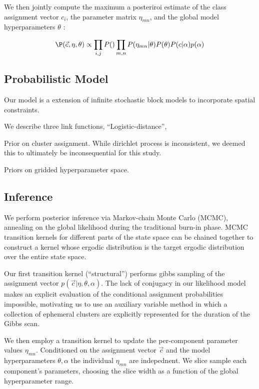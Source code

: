 \documentclass{nature}
\begin{document}
We then jointly compute the maximum a posteriroi estimate of the class
assignment vector ${c_i}$, the parameter matrix $\eta_{mn}$, and the
global model hyperparameters $\theta$ :

\begin{equation}
  \P(\vec{c}, \eta, \theta) \propto \prod_{i, j} P() \prod_{m, n} P(\eta_{mn} | \theta)  P(\theta) P(c | \alpha) p(\alpha) 
\end{equation}



\subsection{Probabilistic Model}

Our model is a extension of infinite stochastic block models
\cite{Kemp, other guys} to incorporate spatial constraints.

We describe three link functions, ``Logistic-distance'', 

Prior on cluster assignment. While dirichlet process is inconsistent,
we deemed this to ultimately be inconsequential for this study.

Priors on gridded hyperparameter space. 



\subsection{Inference} 
We perform posterior inference via Markov-chain Monte Carlo (MCMC),
annealing on the global likelihood during the traditional burn-in
phase. MCMC transition kernels for different parts of the state space
can be chained together to construct a kernel whose ergodic
distribution is the target ergodic distribution over the entire state space. 

Our first transition kernel (``structural'') performs gibbs sampling 
of the assignment vector $p(\vec{c} | \eta, \theta, \alpha)$. 
The lack of conjugacy in our likelihood model makes an explicit 
evaluation of the conditional assignment probabilities impossible, 
motivating us to use an auxiliary variable method \autocite{Neal}
in which a collection of ephemeral clusters are explicitly represented
for the duration of the Gibbs scan. 

We then employ a transition kernel to update the per-component
parameter values $\eta_{mn}$. Conditioned on the assignment vector
$\vec{c}$ and the model hyperparameters $\theta, \alpha$ the 
individual $\eta_{mn}$ are indepednent. We slice sample \autocite{neal}
each component's parameters, choosing the slice width as a function
of the global hyperparameter range. 
\end{document}
